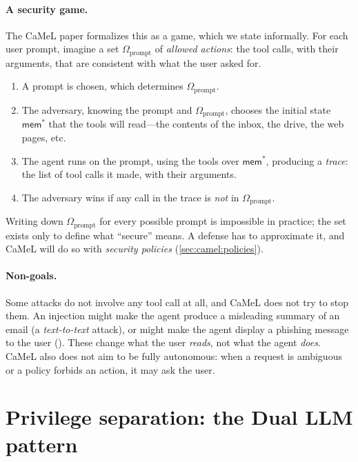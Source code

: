 \paragraph{A security game.}
The CaMeL paper formalizes this as a game, which we state informally.
For each user prompt, imagine a set $\Omega_{\text{prompt}}$ of
\emph{allowed actions}: the tool calls, with their arguments, that are
consistent with what the user asked for.
\begin{enumerate}
  \item A prompt is chosen, which determines $\Omega_{\text{prompt}}$.
  \item The adversary, knowing the prompt and $\Omega_{\text{prompt}}$,
    chooses the initial state $\mathsf{mem}^*$ that the tools will
    read---the contents of the inbox, the drive, the web pages, etc.
  \item The agent runs on the prompt, using the tools over
    $\mathsf{mem}^*$, producing a \emph{trace}: the list of tool calls
    it made, with their arguments.
  \item The adversary wins if any call in the trace is \emph{not} in
    $\Omega_{\text{prompt}}$.
\end{enumerate}
Writing down $\Omega_{\text{prompt}}$ for every possible prompt is
impossible in practice; the set exists only to define what ``secure''
means.
A defense has to approximate it, and CaMeL will do so with
\emph{security policies} (\cref{sec:camel:policies}).

\paragraph{Non-goals.}
Some attacks do not involve any tool call at all, and CaMeL does not try
to stop them.
An injection might make the agent produce a misleading summary of an
email (a \emph{text-to-text} attack), or might make the agent display a
phishing message to the user ().
These change what the user \emph{reads}, not what the agent \emph{does}.
CaMeL also does not aim to be fully autonomous: when a request is
ambiguous or a policy forbids an action, it may ask the user.

\section{Privilege separation: the Dual LLM pattern}
\label{sec:camel:dual}

